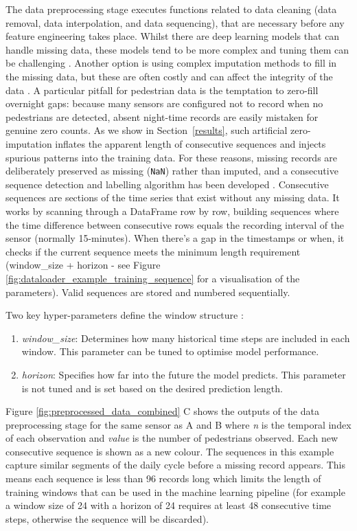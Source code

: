 \documentclass[journal,sensors,submit,pdftex,moreauthors]{Definitions/mdpi}
\begin{document}
The data preprocessing stage executes functions related to data cleaning (data removal, data interpolation, and data sequencing), that are necessary before any feature engineering takes place. Whilst there are deep learning models that can handle missing data, these models tend to be more complex and tuning them can be challenging \citep{cheRecurrentNeuralNetworks2018}. Another option is using complex imputation methods to fill in the missing data, but these are often costly and can affect the integrity of the data \citep{cheRecurrentNeuralNetworks2018}. A particular pitfall for pedestrian data is the temptation to zero-fill overnight gaps: because many sensors are configured not to record when no pedestrians are detected, absent night-time records are easily mistaken for genuine zero counts. As we show in Section~\ref{results}, such artificial zero-imputation inflates the apparent length of consecutive sequences and injects spurious patterns into the training data. For these reasons, missing records are deliberately preserved as missing (\texttt{NaN}) rather than imputed, and a consecutive sequence detection and labelling algorithm has been developed \citep{MorrisWiltshireCode2025}. Consecutive sequences are sections of the time series that exist without any missing data. It works by scanning through a DataFrame row by row, building sequences where the time difference between consecutive rows equals the recording interval of the sensor (normally 15-minutes). When there's a gap in the timestamps or when, it checks if the current sequence meets the minimum length requirement (window\_size + horizon - see Figure \ref{fig:dataloader_example_training_sequence} for a visualisation of the parameters). Valid sequences are stored and numbered sequentially.

Two key hyper-parameters define the window structure \citep{langkvistReviewUnsupervisedFeature2014}:
\begin{enumerate}
    \item \textit{window\_size}: Determines how many historical time steps are included in each window. This parameter can be tuned to optimise model performance.
    \item \textit{horizon}: Specifies how far into the future the model predicts. This parameter is not tuned and is set based on the desired prediction length.
\end{enumerate}


Figure \ref{fig:preprocessed_data_combined} C shows the outputs of the data preprocessing stage for the same sensor as A and B where \textit{n} is the temporal index of each observation and \textit{value} is the number of pedestrians observed. Each new consecutive sequence is shown as a new colour. The sequences in this example capture similar segments of the daily cycle before a missing record appears. This means each sequence is less than 96 records long which limits the length of training windows that can be used in the machine learning pipeline (for example a window size of 24 with a horizon of 24 requires at least 48 consecutive time steps, otherwise the sequence will be discarded).
\end{document}
